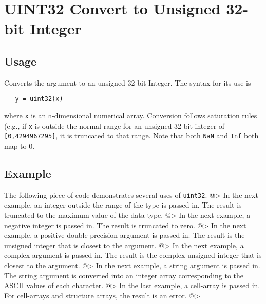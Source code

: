 \section{UINT32 Convert to Unsigned 32-bit Integer}

\subsection{Usage}

Converts the argument to an unsigned 32-bit Integer.  The syntax
for its use is
\begin{verbatim}
   y = uint32(x)
\end{verbatim}
where \verb|x| is an \verb|n|-dimensional numerical array.  Conversion
follows saturation rules (e.g., if \verb|x| is outside the normal
range for an unsigned 32-bit integer of \verb|[0,4294967295]|, it is
truncated to that range. Note that both \verb|NaN| and \verb|Inf| both map to 0.
\subsection{Example}

The following piece of code demonstrates several uses of \verb|uint32|.
@>
In the next example, an integer outside the range of the type is passed in.  
The result is truncated to the maximum value of the data type.
@>
In the next example, a negative integer is passed in.  The result is 
truncated to zero.
@>
In the next example, a positive double precision argument is passed in.  
The result is the unsigned integer that is closest to the argument.
@>
In the next example, a complex argument is passed in.  The result is the 
complex unsigned integer that is closest to the argument.
@>
In the next example, a string argument is passed in.  The string argument 
is converted into an integer array corresponding to the ASCII values of each character.
@>
In the last example, a cell-array is passed in.  For cell-arrays and 
structure arrays, the result is an error.
@>
